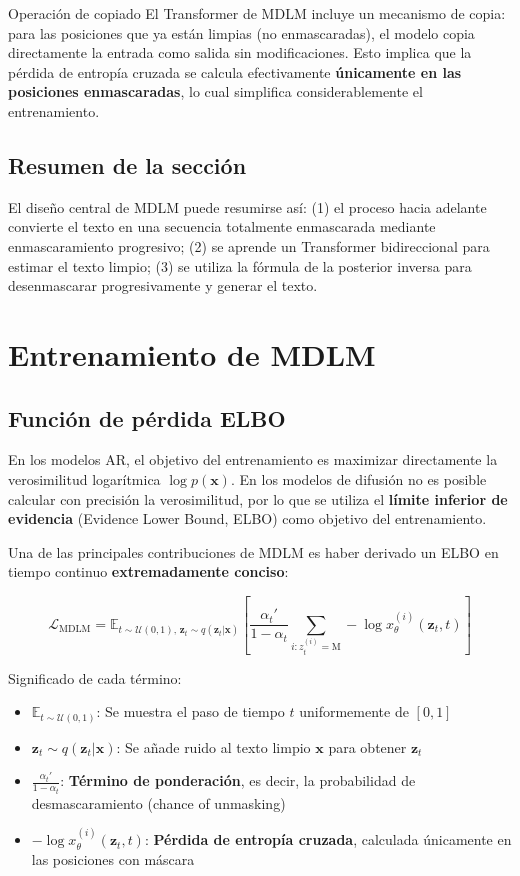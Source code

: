 \documentclass[a4paper]{article}
\begin{document}
\begin{knowledgebox}{Operación de copiado}
El Transformer de MDLM incluye un mecanismo de copia: para las posiciones que ya están limpias (no enmascaradas), el modelo copia directamente la entrada como salida sin modificaciones. Esto implica que la pérdida de entropía cruzada se calcula efectivamente \textbf{únicamente en las posiciones enmascaradas}, lo cual simplifica considerablemente el entrenamiento.
\end{knowledgebox}

\subsection{Resumen de la sección}

El diseño central de MDLM puede resumirse así: (1) el proceso hacia adelante convierte el texto en una secuencia totalmente enmascarada mediante enmascaramiento progresivo; (2) se aprende un Transformer bidireccional para estimar el texto limpio; (3) se utiliza la fórmula de la posterior inversa para desenmascarar progresivamente y generar el texto.

\newpage
\section{Entrenamiento de MDLM}

\subsection{Función de pérdida ELBO}

En los modelos AR, el objetivo del entrenamiento es maximizar directamente la verosimilitud logarítmica $\log p(\mathbf{x})$. En los modelos de difusión no es posible calcular con precisión la verosimilitud, por lo que se utiliza el \textbf{límite inferior de evidencia} (Evidence Lower Bound, ELBO) como objetivo del entrenamiento.

Una de las principales contribuciones de MDLM es haber derivado un ELBO en tiempo continuo \textbf{extremadamente conciso}:

$$\mathcal{L}_{\text{MDLM}} = \mathbb{E}_{t \sim \mathcal{U}(0,1), \, \mathbf{z}_t \sim q(\mathbf{z}_t|\mathbf{x})} \left[ \frac{\alpha_t'}{1 - \alpha_t} \sum_{i: z_t^{(i)} = \text{M}} -\log x_\theta^{(i)}(\mathbf{z}_t, t) \right]$$

Significado de cada término:
\begin{itemize}
    \item $\mathbb{E}_{t \sim \mathcal{U}(0,1)}$: Se muestra el paso de tiempo $t$ uniformemente de $[0, 1]$
    \item $\mathbf{z}_t \sim q(\mathbf{z}_t | \mathbf{x})$: Se añade ruido al texto limpio $\mathbf{x}$ para obtener $\mathbf{z}_t$
    \item $\frac{\alpha_t'}{1 - \alpha_t}$: \textbf{Término de ponderación}, es decir, la probabilidad de desmascaramiento (chance of unmasking)
    \item $-\log x_\theta^{(i)}(\mathbf{z}_t, t)$: \textbf{Pérdida de entropía cruzada}, calculada únicamente en las posiciones con máscara
\end{itemize}
\end{document}
